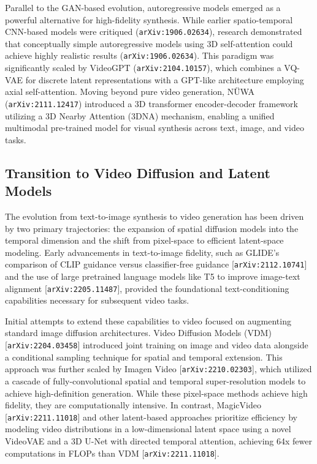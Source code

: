 \documentclass[11pt]{article}
\begin{document}
Parallel to the GAN-based evolution, autoregressive models emerged as a powerful alternative for high-fidelity synthesis. While earlier spatio-temporal CNN-based models were critiqued (\texttt{arXiv:1906.02634}), research demonstrated that conceptually simple autoregressive models using 3D self-attention could achieve highly realistic results (\texttt{arXiv:1906.02634}). This paradigm was significantly scaled by VideoGPT (\texttt{arXiv:2104.10157}), which combines a VQ-VAE for discrete latent representations with a GPT-like architecture employing axial self-attention. Moving beyond pure video generation, NÜWA (\texttt{arXiv:2111.12417}) introduced a 3D transformer encoder-decoder framework utilizing a 3D Nearby Attention (3DNA) mechanism, enabling a unified multimodal pre-trained model for visual synthesis across text, image, and video tasks.

\subsection{Transition to Video Diffusion and Latent Models}

The evolution from text-to-image synthesis to video generation has been driven by two primary trajectories: the expansion of spatial diffusion models into the temporal dimension and the shift from pixel-space to efficient latent-space modeling. Early advancements in text-to-image fidelity, such as GLIDE's comparison of CLIP guidance versus classifier-free guidance [\texttt{arXiv:2112.10741}] and the use of large pretrained language models like T5 to improve image-text alignment [\texttt{arXiv:2205.11487}], provided the foundational text-conditioning capabilities necessary for subsequent video tasks.

Initial attempts to extend these capabilities to video focused on augmenting standard image diffusion architectures. Video Diffusion Models (VDM) [\texttt{arXiv:2204.03458}] introduced joint training on image and video data alongside a conditional sampling technique for spatial and temporal extension. This approach was further scaled by Imagen Video [\texttt{arXiv:2210.02303}], which utilized a cascade of fully-convolutional spatial and temporal super-resolution models to achieve high-definition generation. While these pixel-space methods achieve high fidelity, they are computationally intensive. In contrast, MagicVideo [\texttt{arXiv:2211.11018}] and other latent-based approaches prioritize efficiency by modeling video distributions in a low-dimensional latent space using a novel VideoVAE and a 3D U-Net with directed temporal attention, achieving 64x fewer computations in FLOPs than VDM [\texttt{arXiv:2211.11018}].
\end{document}
